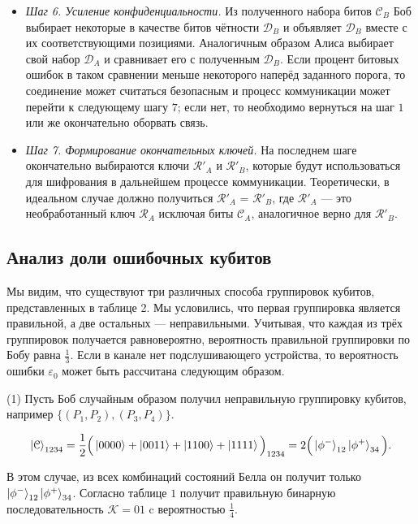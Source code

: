 \documentclass[a4paper,11pt]{article}
\begin{document}
\begin{itemize}
\item \textit{Шаг 6. Усиление конфиденциальности.} Из полученного набора битов $\mathcal{C}_B$ Боб выбирает некоторые в качестве битов чётности $\mathcal{D}_B$ и объявляет $\mathcal{D}_B$ вместе с их соответствующими позициями. Аналогичным образом Алиса выбирает свой набор $\mathcal{D}_A$ и сравнивает его с полученным $\mathcal{D}_B$. Если процент битовых ошибок в таком сравнении меньше некоторого наперёд заданного порога, то соединение может считаться безопасным и процесс коммуникации может перейти к следующему шагу $7$; если нет, то необходимо вернуться на шаг $1$ или же окончательно оборвать связь.

\item \textit{Шаг 7. Формирование окончательных ключей.} На последнем шаге окончательно выбираются ключи $\mathcal{R'}_A$ и $\mathcal{R'}_B$, которые будут использоваться для шифрования в дальнейшем процессе коммуникации. Теоретически, в идеальном случае должно получиться $\mathcal{R'}_A$ = $\mathcal{R'}_B$, где $\mathcal{R'}_A$ --- это необработанный ключ $\mathcal{R}_A$ исключая биты $\mathcal{C}_A$, аналогичное верно для $\mathcal{R'}_B$.
\end{itemize}

\subsection{Анализ доли ошибочных кубитов}

Мы видим, что существуют три различных способа группировок кубитов, представленных в таблице 2. Мы условились, что первая группировка является правильной, а две остальных --- неправильными. Учитывая, что каждая из трёх группировок получается равновероятно, вероятность правильной группировки по Бобу равна $\frac{1}{3}$. Если в канале нет подслушивающего устройства, то вероятность ошибки $\varepsilon_0$ может быть рассчитана следующим образом.

(1) Пусть Боб случайным образом получил неправильную группировку кубитов, например $\{(P_1 , P_2), (P_3 , P_4)\}$.

\begin{equation*}
\ket{\mathcal{C}}_{1234} = \dfrac{1}{2} \Big(\ket{0000} + \ket{0011}
 + \ket{1100} + \ket{1111} \Big)_{1234} = 2 \Big(\ket{\phi^-}_{12} \ket{\phi^+}_{34}\Big).
\end{equation*}

В этом случае, из всех комбинаций состояний Белла он получит только $\ket{\phi^-}_{12} \ket{\phi^+}_{34}$. Согласно таблице $1$ получит правильную бинарную последовательность $\mathcal{K} = 01$ c вероятностью $\frac{1}{4}$.
\end{document}
